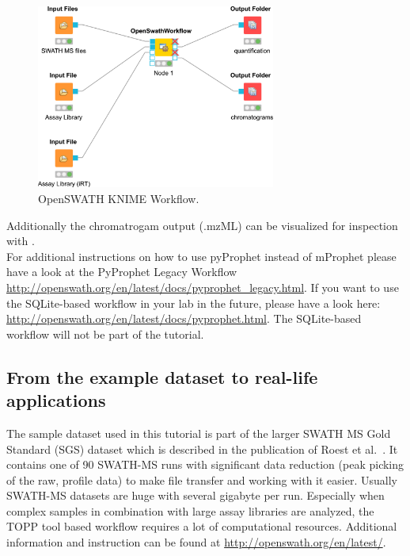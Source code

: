 \begin{figure}[!ht]
  \includegraphics[width=0.7\textwidth]{graphics/openswath/OpenSWATHWF.png}
  \caption{OpenSWATH KNIME Workflow.}
  \label{fig:openswath}
\end{figure}

\noindent Additionally the chromatrogam output (.mzML) can be visualized for inspection with . \\

\noindent For additional instructions on how to use pyProphet instead of mProphet please have a look at the PyProphet Legacy Workflow \url{http://openswath.org/en/latest/docs/pyprophet_legacy.html}. If you want to use the SQLite-based workflow in your lab in the future, please have a look here: \url{http://openswath.org/en/latest/docs/pyprophet.html}. The SQLite-based workflow will not be part of the tutorial. \\

\subsection{From the example dataset to real-life applications}
The sample dataset used in this tutorial is part of the larger SWATH MS Gold Standard (SGS) dataset which is described in the publication of Roest et al.~\cite{Rost2014fd}.
It contains one of 90 SWATH-MS runs with significant data reduction (peak picking of the raw, profile data) to make file transfer and working with it easier. Usually SWATH-MS datasets are huge with several gigabyte per run. Especially when complex samples in combination with large assay libraries are analyzed, the TOPP tool based workflow requires a lot of computational resources. Additional information and instruction can be found at \url{http://openswath.org/en/latest/}.

